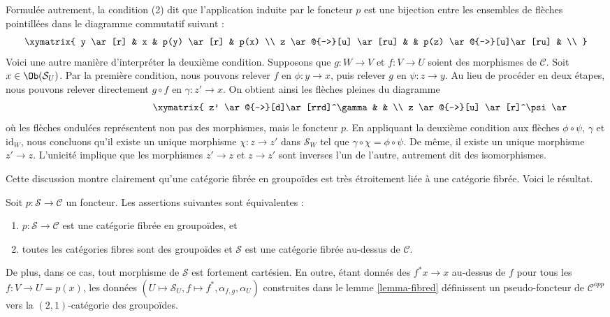 \noindent
Formulée autrement, la condition (2) dit que
l'application induite par le foncteur $p$ est une bijection entre les ensembles
de flèches pointillées dans le diagramme commutatif suivant :
$$
\xymatrix{
y \ar[r] & x & p(y) \ar[r] & p(x) \\
z \ar@{-->}[u] \ar[ru] & & p(z) \ar@{-->}[u]\ar[ru] & \\
}
$$
Voici une autre manière d'interpréter la deuxième condition.
Supposons que $g : W \to V$ et $f : V \to U$ soient des morphismes de $\mathcal{C}$.
Soit $x \in \Ob(\mathcal{S}_U)$. Par la première condition, nous pouvons relever
$f$ en $ \phi : y \to x$, puis relever $g$ en $\psi : z \to y$.
Au lieu de procéder en deux étapes, nous pouvons relever directement $g \circ f$ en
$\gamma : z' \to x$. On obtient ainsi les flèches pleines du diagramme
\begin{equation}
\label{equation-fibred-groupoids}
\vcenter{
\xymatrix{
z' \ar@{-->}[d]\ar[rrd]^\gamma & & \\
z \ar@{-->}[u] \ar[r]^\psi \ar@{~>}[d]^p &
y \ar[r]^\phi \ar@{~>}[d]^p &
x \ar@{~>}[d]^p
\\
W \ar[r]^g & V \ar[r]^f & U \\
}
}
\end{equation}
où les flèches ondulées représentent non pas des morphismes, mais le foncteur $p$.
En appliquant la deuxième condition aux flèches $\phi \circ \psi$, $\gamma$
et $\text{id}_W$, nous concluons qu'il existe un unique morphisme
$\chi : z \to z'$ dans $\mathcal{S}_W$ tel que
$\gamma \circ \chi = \phi \circ \psi$. De même, il existe un unique morphisme
$z' \to z$. L'unicité implique que les morphismes $z' \to z$ et
$z\to z'$ sont inverses l'un de l'autre, autrement dit des isomorphismes.

\medskip\noindent
Cette discussion montre clairement qu'une
catégorie fibrée en groupoïdes est très étroitement liée
à une catégorie fibrée. Voici le résultat.

\begin{lemma}
\label{lemma-fibred-groupoids}
Soit $p : \mathcal{S} \to \mathcal{C}$ un foncteur.
Les assertions suivantes sont équivalentes :
\begin{enumerate}
\item $p : \mathcal{S} \to \mathcal{C}$ est une catégorie
fibrée en groupoïdes, et
\item toutes les catégories fibres sont des groupoïdes et
$\mathcal{S}$ est une catégorie fibrée au-dessus de $\mathcal{C}$.

\end{enumerate}
De plus, dans ce cas, tout morphisme de $\mathcal{S}$ est
fortement cartésien. En outre, étant donnés des $f^\ast x \to x$
au-dessus de $f$ pour tous les $f: V \to U = p(x)$, les données
$(U \mapsto \mathcal{S}_U, f \mapsto f^*, \alpha_{f, g}, \alpha_U)$
construites dans le lemme \ref{lemma-fibred}
définissent un pseudo-foncteur de $\mathcal{C}^{opp}$ vers
la $(2, 1)$-catégorie des groupoïdes.
\end{lemma}

